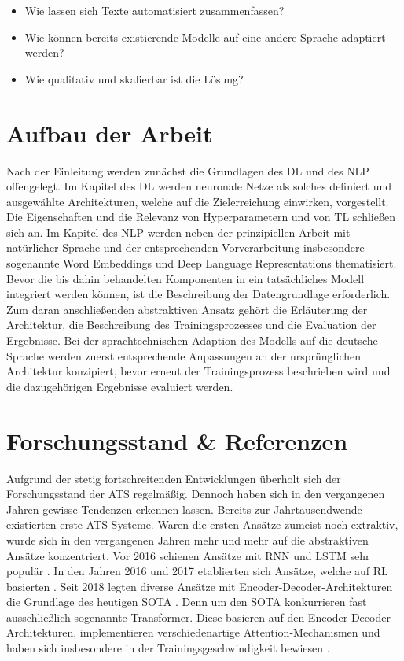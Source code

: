 \begin{itemize}
	\item Wie lassen sich Texte automatisiert zusammenfassen?
	\item Wie können bereits existierende Modelle auf eine andere Sprache adaptiert werden?
	\item Wie qualitativ und skalierbar ist die Lösung?
\end{itemize}
\newpage


\section{Aufbau der Arbeit}
\noindent
Nach der Einleitung werden zunächst die Grundlagen des \ac{DL} und des \ac{NLP} offengelegt. Im Kapitel des \ac{DL} werden neuronale Netze als solches definiert und ausgewählte Architekturen, welche auf die Zielerreichung einwirken, vorgestellt. Die Eigenschaften und die Relevanz von Hyperparametern und von \ac{TL} schließen sich an. Im Kapitel des \ac{NLP} werden neben der prinzipiellen Arbeit mit natürlicher Sprache und der entsprechenden Vorverarbeitung insbesondere sogenannte Word Embeddings und Deep Language Representations thematisiert.\\

\noindent
Bevor die bis dahin behandelten Komponenten in ein tatsächliches Modell integriert werden können, ist die Beschreibung der Datengrundlage erforderlich. Zum daran anschließenden abstraktiven Ansatz gehört die Erläuterung der Architektur, die Beschreibung des Trainingsprozesses und die Evaluation der Ergebnisse. Bei der sprachtechnischen Adaption des Modells auf die deutsche Sprache werden zuerst entsprechende Anpassungen an der ursprünglichen Architektur konzipiert, bevor erneut der Trainingsprozess beschrieben wird und die dazugehörigen Ergebnisse evaluiert werden.


\section{Forschungsstand \& Referenzen}
\noindent
Aufgrund der stetig fortschreitenden Entwicklungen überholt sich der Forschungsstand der \ac{ATS} regelmäßig. Dennoch haben sich in den vergangenen Jahren gewisse Tendenzen erkennen lassen. Bereits zur Jahrtausendwende existierten erste \ac{ATS}-Systeme. Waren die ersten Ansätze zumeist noch extraktiv, wurde sich in den vergangenen Jahren mehr und mehr auf die abstraktiven Ansätze konzentriert. Vor 2016 schienen Ansätze mit \ac{RNN} und \ac{LSTM} sehr populär \cite{NAL16}. In den Jahren 2016 und 2017 etablierten sich Ansätze, welche auf \ac{RL} basierten \cite{PAU17}. Seit 2018 legten diverse Ansätze mit Encoder-Decoder-Architekturen die Grundlage des heutigen \ac{SOTA} \cite{YAN19, ROT20}. Denn um den \ac{SOTA} konkurrieren fast ausschließlich sogenannte Transformer. Diese basieren auf den Encoder-Decoder-Architekturen, implementieren verschiedenartige Attention-Mechanismen und haben sich insbesondere in der Trainingsgeschwindigkeit bewiesen \cite{ZHA20}.\\
\newpage

